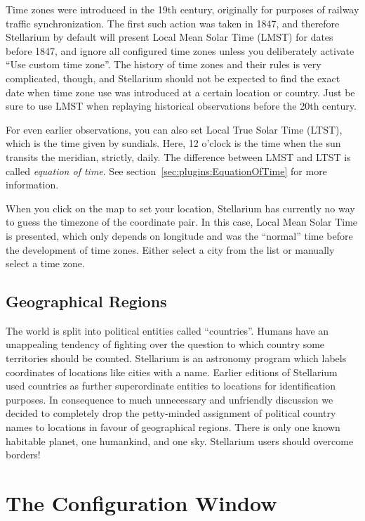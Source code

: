 Time zones were introduced in the 19th century, originally for
purposes of railway traffic synchronization. The first such action was
taken in 1847, and therefore Stellarium by default will present Local
Mean Solar Time (LMST) for dates before 1847, and ignore all
configured time zones unless you deliberately activate ``Use custom
time zone''. The history of time zones and their rules is very
complicated, though, and Stellarium should not be expected to find the
exact date when time zone use was introduced at a certain location or
country. Just be sure to use LMST when replaying historical
observations before the 20th century.

For even earlier observations, you can also set Local True Solar Time
(LTST), which is the time given by sundials. Here, 12 o'clock is the
time when the sun transits the meridian, strictly, daily. The
difference between LMST and LTST is called \emph{equation of time}. 
See section~\ref{sec:plugins:EquationOfTime} for more information.

When you click on the map to set your location, Stellarium has
currently no way to guess the timezone of the coordinate pair. In this
case, Local Mean Solar Time is presented, which only depends on
longitude and was the ``normal'' time before the development of time
zones. Either select a city from the list or manually select a time
zone.

\subsection{Geographical Regions}
\label{sec:gui:location:geographicalregions}

The world is split into political entities called ``countries''.  
Humans have an unappealing tendency of fighting over the question to which 
country some territories should be counted. Stellarium is an astronomy 
program which labels coordinates of locations like cities with a name. 
Earlier editions of Stellarium used countries as further superordinate 
entities to locations for identification purposes. In consequence to much 
unnecessary and unfriendly discussion we decided to completely drop the 
petty-minded assignment of political country names to locations in favour 
of geographical regions. There is only one known habitable planet, one 
humankind, and one sky. Stellarium users should overcome borders!

\section{The Configuration Window}
\label{sec:gui:configuration}

